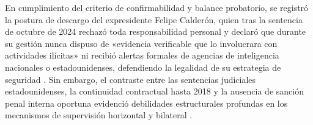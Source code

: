 En cumplimiento del criterio de confirmabilidad y balance probatorio, se registró la postura de descargo del expresidente Felipe Calderón, quien tras la sentencia de octubre de 2024 rechazó toda responsabilidad personal y declaró que durante su gestión nunca dispuso de «evidencia verificable que lo involucrara con actividades ilícitas» ni recibió alertas formales de agencias de inteligencia nacionales o estadounidenses, defendiendo la legalidad de su estrategia de seguridad \citep{infobae2024}. Sin embargo, el contraste entre las sentencias judiciales estadounidenses, la continuidad contractual hasta 2018 y la ausencia de sanción penal interna oportuna evidenció debilidades estructurales profundas en los mecanismos de supervisión horizontal y bilateral \citep{insightcrime2023,merino2024,vazquezvalencia2019}.